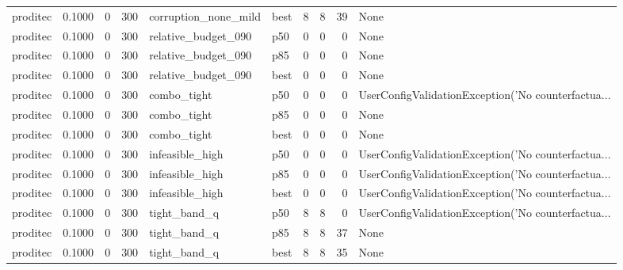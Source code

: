 \begin{tabular}{lrrrllrrrl}
proditec &    0.1000 &    0 &    300 & corruption\_none\_mild &   best &               8 &          8 &      39 &                                               None \\
proditec &    0.1000 &    0 &    300 &  relative\_budget\_090 &    p50 &               0 &          0 &       0 &                                               None \\
proditec &    0.1000 &    0 &    300 &  relative\_budget\_090 &    p85 &               0 &          0 &       0 &                                               None \\
proditec &    0.1000 &    0 &    300 &  relative\_budget\_090 &   best &               0 &          0 &       0 &                                               None \\
proditec &    0.1000 &    0 &    300 &          combo\_tight &    p50 &               0 &          0 &       0 & UserConfigValidationException('No counterfactua... \\
proditec &    0.1000 &    0 &    300 &          combo\_tight &    p85 &               0 &          0 &       0 &                                               None \\
proditec &    0.1000 &    0 &    300 &          combo\_tight &   best &               0 &          0 &       0 &                                               None \\
proditec &    0.1000 &    0 &    300 &      infeasible\_high &    p50 &               0 &          0 &       0 & UserConfigValidationException('No counterfactua... \\
proditec &    0.1000 &    0 &    300 &      infeasible\_high &    p85 &               0 &          0 &       0 & UserConfigValidationException('No counterfactua... \\
proditec &    0.1000 &    0 &    300 &      infeasible\_high &   best &               0 &          0 &       0 & UserConfigValidationException('No counterfactua... \\
proditec &    0.1000 &    0 &    300 &         tight\_band\_q &    p50 &               8 &          8 &       0 & UserConfigValidationException('No counterfactua... \\
proditec &    0.1000 &    0 &    300 &         tight\_band\_q &    p85 &               8 &          8 &      37 &                                               None \\
proditec &    0.1000 &    0 &    300 &         tight\_band\_q &   best &               8 &          8 &      35 &                                               None \\

\end{tabular}
